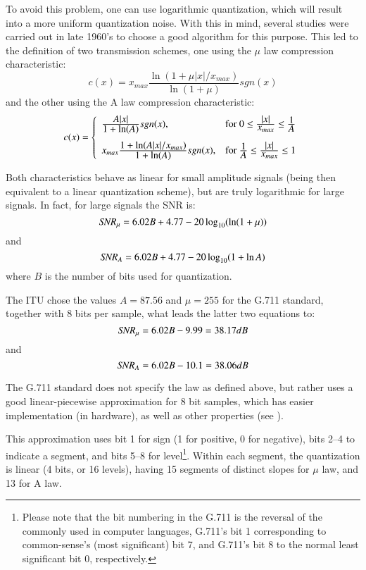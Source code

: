 To avoid this problem, one can use logarithmic quantization, which
will result into a more uniform quantization noise. With this in
mind, several studies were carried out in late 1960's to choose a
good algorithm for this purpose. This led to the definition of two
transmission schemes, one using the $\mu$ law compression
characteristic: 
\[ 
   c(x) = x_{max} \frac{\ln(1 + \mu |x|/x_{max}) }{
                        \ln(1+\mu) } sgn(x) 
\] 
and the other using the A law compression characteristic: 
\[ 
   c(x) = \left \{ \begin{array}{ll}
          {\displaystyle A|x| \over \displaystyle 1 + \ln(A) } sgn(x), 
                &\mbox{for } 0 \leq \Frac{|x|}{x_{max}} \leq \Frac{1}{A}\\
          x_{max} {\displaystyle 1 + \ln(A|x|/x_{max}) \over 
                   \displaystyle 1 + \ln(A) } sgn(x),
                &\mbox{for \ruley{2em}} 
                   \Frac{1}{A} \leq \Frac{|x|}{x_{max}} \leq 1
          \end{array}
       \right .
\]

Both characteristics behave as linear for small amplitude signals
(being then equivalent to a linear quantization scheme), but are truly
logarithmic for large signals. In fact, for large signals the SNR is:
\[
    \mbox{\em SNR}_\mu = 6.02 B + 4.77 - 20 \log_{10} (\ln(1+\mu))
\]
and
\[
    \mbox{\em SNR}_A = 6.02 B + 4.77 - 20 \log_{10} (1 + \ln A)
\]
where $B$ is the number of bits used for quantization.

The ITU chose the values $A=87.56$ and $\mu=255$ for the G.711
standard, together with 8 bits per sample, what leads the latter two
equations to:
\[
    \mbox{\em SNR}_\mu = 6.02 B - 9.99 = 38.17 dB
\]
and
\[
    \mbox{\em SNR}_A = 6.02 B - 10.1 = 38.06 dB
\]

The G.711 standard does not specify the law as defined above, but
rather uses a good linear-piecewise approximation for 8 bit samples,
which has easier implementation (in hardware), as well as other
properties (see \cite[p.229]{Jayant-Noll}).

This approximation uses bit 1 for sign (1 for positive, 0 for
negative), bits 2--4 to indicate a segment, and bits 5--8 for
level\footnote{\SF Please note that the bit numbering in the G.711 is
the reversal of the commonly used in computer languages, G.711's bit 1
corresponding to common-sense's (most significant) bit 7, and G.711's
bit 8 to the normal least significant bit 0, respectively.}. Within
each segment, the quantization is linear (4 bits, or 16 levels), having
15 segments of distinct slopes for $\mu$ law, and 13 for A law.


